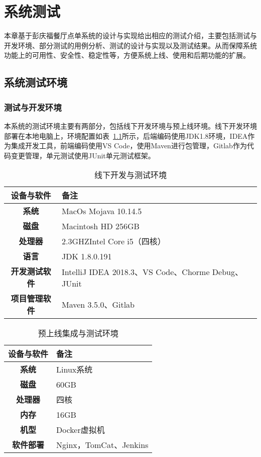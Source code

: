 \chapter{系统测试}
本章基于彭庆福餐厅点单系统的设计与实现给出相应的测试介绍，主要包括测试与开发环境、部分测试的用例分析、测试的设计与实现以及测试结果。从而保障系统功能上的可用性、安全性、稳定性等，方便系统上线、使用和后期功能的扩展。
\section{系统测试环境}
\subsection{测试与开发环境}
本系统的测试环境主要有两部分，包括线下开发环境与预上线环境。线下开发环境部署在本地电脑上，环境配置如表~\ref{table:textEnvironment}所示，后端编码使用JDK1.8环境，IDEA作为集成开发工具，前端编码使用VS Code，使用Maven进行包管理，Gitlab作为代码变更管理，单元测试使用JUnit单元测试框架。

\begin{table}[htbp!]\footnotesize
    \centering
    \caption{线下开发与测试环境}
    \vspace{2mm}
    \begin{tabular}{cp{}}
    \toprule
    \textbf{设备与软件}&\textbf{备注}\\
    \midrule 
    \textbf{系统}& MacOs Mojava 10.14.5\\
    \hline
    \textbf{磁盘}& Macintosh HD 256GB\\
    \hline
    \textbf{处理器}& 2.3GHZIntel Core i5（四核）\\
    \hline
    \textbf{语言}& JDK 1.8.0.191\\
    \hline
    \textbf{开发测试软件}& IntelliJ IDEA 2018.3、VS Code、Chorme Debug、JUnit\\
    \hline
    \textbf{项目管理软件}& Maven 3.5.0、Gitlab\\
    \bottomrule
    \end{tabular}
    \label{table:textEnvironment}
\end{table}

\begin{table}[htbp!]\footnotesize
    \centering
    \caption{预上线集成与测试环境}
    \vspace{2mm}
    \begin{tabular}{cp{}}
    \toprule
    \textbf{设备与软件}&\textbf{备注}\\
    \midrule 
    \textbf{系统}& Linux系统\\
    \hline
    \textbf{磁盘}& 60GB\\
    \hline
    \textbf{处理器}& 四核\\
    \hline
    \textbf{内存}& 16GB\\
    \hline
    \textbf{机型}& Docker虚拟机\\
    \hline
    \textbf{软件部署}& Nginx，TomCat、Jenkins\\
    \bottomrule
    \end{tabular}
    \label{table:textEnvironment2}
\end{table}

